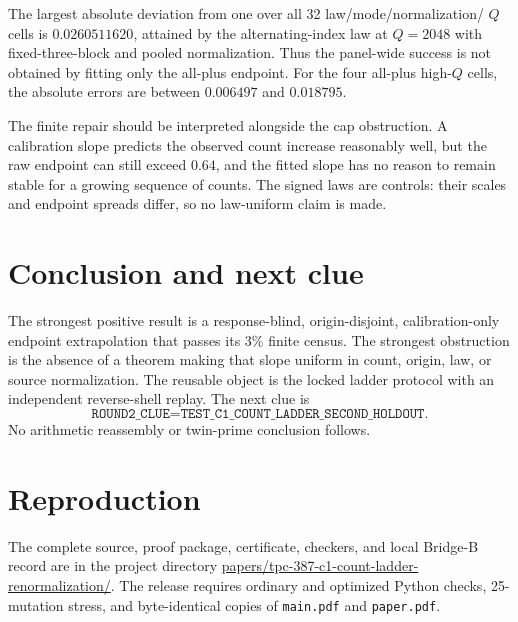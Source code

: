 \documentclass[10pt]{article}
\begin{document}
The largest absolute deviation from one over all 32 law/mode/normalization/
$Q$ cells is $0.0260511620$, attained by the alternating-index law at
$Q=2048$ with fixed-three-block and pooled normalization.  Thus the panel-wide
success is not obtained by fitting only the all-plus endpoint.  For the four
all-plus high-$Q$ cells, the absolute errors are between $0.006497$ and
$0.018795$.

The finite repair should be interpreted alongside the cap obstruction.  A
calibration slope predicts the observed count increase reasonably well, but
the raw endpoint can still exceed $0.64$, and the fitted slope has no reason
to remain stable for a growing sequence of counts.  The signed laws are
controls: their scales and endpoint spreads differ, so no law-uniform claim
is made.

\section{Conclusion and next clue}

The strongest positive result is a response-blind, origin-disjoint,
calibration-only endpoint extrapolation that passes its 3\% finite census.
The strongest obstruction is the absence of a theorem making that slope
uniform in count, origin, law, or source normalization.  The reusable object
is the locked ladder protocol with an independent reverse-shell replay.
The next clue is
\[
 \texttt{ROUND2\_CLUE=TEST\_C1\_COUNT\_LADDER\_SECOND\_HOLDOUT}.
\]
No arithmetic reassembly or twin-prime conclusion follows.

\section*{Reproduction}

The complete source, proof package, certificate, checkers, and local Bridge-B
record are in the project directory
\url{papers/tpc-387-c1-count-ladder-renormalization/}.  The release requires
ordinary and optimized Python checks, 25-mutation stress, and byte-identical
copies of \texttt{main.pdf} and \texttt{paper.pdf}.
\end{document}
